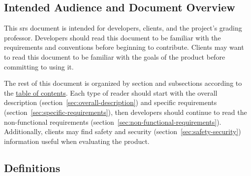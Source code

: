     \subsection{Intended Audience and Document Overview}\label{sec:audience-overview}
        This \gls{srs} document is intended for developers, clients, and the project's grading professor. Developers should read this document to be familiar with the requirements and conventions before beginning to contribute. Clients may want to read this document to be familiar with the goals of the product before committing to using it.
        \par The rest of this document is organized by section and subsections according to the \hyperref[toc]{table of contents}. Each type of reader should start with the overall description (section~\ref{sec:overall-description}) and specific requirements (section~\ref{sec:specific-requirements}), then developers should continue to read the non-functional requirements (section~\ref{sec:non-functional-requirements}). Additionally, clients may find safety and security (section~\ref{sec:safety-security}) information useful when evaluating the product.
    \subsection{Definitions}\label{sec:definitions}
        \printnoidxglossary
        \printnoidxglossary[type=acronym, title=Acronyms and Abbreviations]
        \printacronyms
    \vspace{-4ex} %
